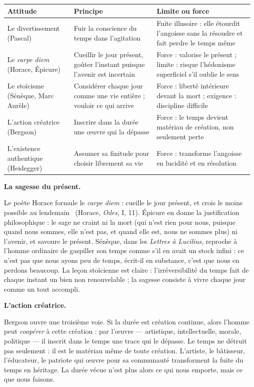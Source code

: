 \documentclass[11pt]{article}
\begin{document}
\begin{center}
\begin{tabularx}{\linewidth}{|l|X|X|}
\hline
\rowcolor{popblueL} \textbf{Attitude} & \textbf{Principe} & \textbf{Limite ou force} \\
\hline
Le divertissement (Pascal) & Fuir la conscience du temps dans l'agitation & Fuite illusoire : elle étourdit l'angoisse sans la résoudre et fait perdre le temps même \\
\hline
Le \emph{carpe diem} (Horace, Épicure) & Cueillir le jour présent, goûter l'instant puisque l'avenir est incertain & Force : valorise le présent ; limite : risque l'hédonisme superficiel s'il oublie le sens \\
\hline
Le stoïcisme (Sénèque, Marc Aurèle) & Considérer chaque jour comme une vie entière ; vouloir ce qui arrive & Force : liberté intérieure devant la mort ; exigence : discipline difficile \\
\hline
L'action créatrice (Bergson) & Inscrire dans la durée une œuvre qui la dépasse & Force : le temps devient matériau de création, non seulement perte \\
\hline
L'existence authentique (Heidegger) & Assumer sa finitude pour choisir librement sa vie & Force : transforme l'angoisse en lucidité et en résolution \\
\hline
\end{tabularx}
\end{center}

\textbf{La sagesse du présent.}\par
Le poète Horace formule le \emph{carpe diem} : \guillemotleft cueille le jour présent, et crois le moins possible au lendemain \guillemotright\ (Horace, \emph{Odes}, I, 11). Épicure en donne la justification philosophique : le sage ne craint ni la mort (qui n'est rien pour nous, puisque quand nous sommes, elle n'est pas, et quand elle est, nous ne sommes plus) ni l'avenir, et savoure le présent. Sénèque, dans les \emph{Lettres à Lucilius}, reproche à l'homme ordinaire de gaspiller son temps comme s'il en avait un stock infini : ce n'est pas que nous ayons peu de temps, écrit-il en substance, c'est que nous en perdons beaucoup. La leçon stoïcienne est claire : l'irréversibilité du temps fait de chaque instant un bien non renouvelable ; la sagesse consiste à vivre chaque jour comme un tout accompli.

\textbf{L'action créatrice.}\par
Bergson ouvre une troisième voie. Si la durée est création continue, alors l'homme peut \emph{coopérer} à cette création : par l'œuvre — artistique, intellectuelle, morale, politique — il inscrit dans le temps une trace qui le dépasse. Le temps ne détruit pas seulement : il est le matériau même de toute création. L'artiste, le bâtisseur, l'éducateur, le patriote qui œuvre pour sa communauté transforment la fuite du temps en héritage. La durée vécue n'est plus alors ce qui nous emporte, mais ce que nous faisons.
\end{document}
